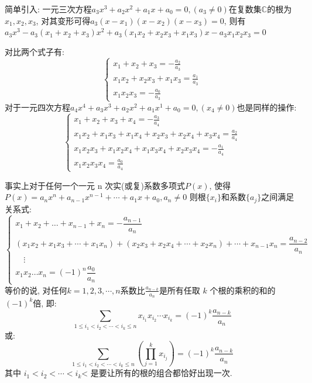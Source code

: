 \documentclass{book}
\begin{document}
    简单引入: 一元三次方程$a_3x^3+a_2x^2+a_1x+a_0=0,(a_3\neq0)$在复数集$\mathbb{C}$的根为$x_1,x_2,x_3$, 对其变形可得$a_3(x-x_1)(x-x_2)(x-x_3)=0$, 则有$a_3x^3-a_3(x_1+x_2+x_3)x^2+a_3(x_1x_2+x_2x_3+x_1x_3)x-a_3x_1x_2x_3=0$

    \textcolor[rgb]{0.75,0.17,0.22}{对比两个式子}有:
    $$
        \left\{\begin{matrix}
            \displaystyle x_1+x_2+x_3=-\frac{a_2}{a_3}         \\
            \displaystyle x_1x_2+x_2x_3+x_1x_3=\frac{a_1}{a_3} \\
            \displaystyle x_1x_2x_3=-\frac{a_0}{a_3}
        \end{matrix}\right.
    $$
    对于一元四次方程$a_4x^4+a_3x^3+a_2x^2+a_1x^1+a_0=0,\left( x_4 \neq 0 \right)$也是同样的操作:
    $$
        \left\{\begin{matrix}
            \displaystyle x_1+x_2+x_3+x_4=-\frac{a_3}{a_4}                          \\
            \displaystyle x_1x_2+x_1x_3+x_1x_4+x_2x_3+x_2x_4+x_3x_4=\frac{a_2}{a_4} \\
            \displaystyle x_1x_2x_3+x_1x_2x_4+x_1x_3x_4+x_2x_3x_4=-\frac{a_1}{a_4}  \\
            \displaystyle x_1x_2x_3x_4=\frac{a_0}{a_4}
        \end{matrix}\right.
    $$

    事实上对于任何一个一元 n 次实(或复)系数多项式$P(x)$, 使得$P(x)=a_nx^n  + a_{n-1}x^{n-1} +\cdots + a_1 x+ a_0,a_n\neq 0$
    则根${\displaystyle \{x_{i}\}}$和系数${\displaystyle \{a_{j}\}}$之间满足关系式:
    $$
        \begin{cases} x_1 + x_2 + \dots + x_{n-1} + x_n = -\dfrac{a_{n-1}}{a_{n}}                                                           \\
            (x_1 x_2 + x_1 x_3+\cdots + x_1 x_n) + (x_2x_3 + x_2x_4+\cdots + x_2x_n)+\cdots + x_{n-1}x_n = \dfrac{a_{n-2}}{a_{n}} \\
            {} \quad \vdots                                                                                                       \\ x_1 x_2 \dots x_n = (-1)^n \dfrac{a_0}{a_n}
        \end{cases}
    $$
    等价的说, 对任何$k=1,2,3,\cdots,n$系数比${\displaystyle {\frac {a_{n-k}}{a_{n}}}}$是所有任取 $k$ 个根的乘积的和的${\displaystyle (-1)^{k}}$倍, 即:
    $$\sum_{1\le i_1 < i_2 < \cdots < i_k\le n} x_{i_1}x_{i_2}\cdots x_{i_k}=(-1)^k\frac{a_{n-k}}{a_n}$$
    或:
    $$\sum_{1\le i_1 < i_2 < \cdots < i_k\le n} \left(\prod_{j = 1}^k x_{i_j}\right)=(-1)^k\frac{a_{n-k}}{a_n}$$
    其中 $i_1 < i_2 < \cdots < i_k$< 是要让所有的根的组合都恰好出现一次.
\end{document}
